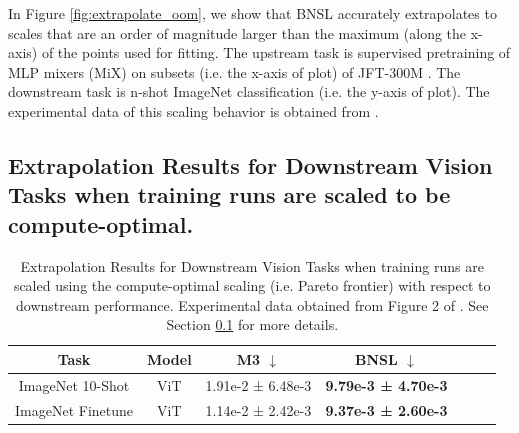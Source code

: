 \documentclass{article} %
\newcommand{\highlight}[1]{\colorbox{blue!10}{#1}}
\begin{document}
In Figure \ref{fig:extrapolate_oom}, we show that BNSL accurately extrapolates to scales that are an order of magnitude larger than the maximum (along the x-axis) of the points used for fitting. The upstream task is supervised pretraining of MLP mixers (MiX) \citep{tolstikhin2021mlp} on subsets (i.e. the x-axis of plot) of JFT-300M \citep{sun2017revisiting}. The downstream task is n-shot ImageNet classification (i.e. the y-axis of plot). The experimental data of this scaling behavior is obtained from \cite{Alabdulmohsi2022revisiting}.

\clearpage

\subsection{Extrapolation Results for Downstream Vision Tasks when training runs are scaled to be compute-optimal.}
\label{section:vision_tasks__compute_optimal}

\begin{table}[hbt!]
    \centering
    \begin{tabular}{ |cc|c|c|c|c|c| } 
\hline
Task & Model & M3 $\downarrow$ & BNSL $\downarrow$\\
 \hline
 
 ImageNet 10-Shot & ViT & 1.91e-2 ± 6.48e-3 & \bfseries 9.79e-3 ± 4.70e-3\\
 ImageNet Finetune & ViT & 1.14e-2 ± 2.42e-3 & \bfseries 9.37e-3 ± 2.60e-3 \\
 \hline
\end{tabular}
    \caption{
    Extrapolation Results for Downstream Vision Tasks when training runs are scaled using the compute-optimal scaling (i.e. Pareto frontier) with respect to downstream performance. Experimental data obtained from Figure 2 of \cite{DBLP:journals/corr/abs-2106-04560}. See Section \ref{section:vision_tasks__compute_optimal} for more details.
    }
    \label{table:vision_compute_scaling}
\end{table}
\end{document}
